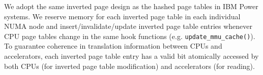 \vspace{2mm}
 We adopt the same inverted
page design as the hashed page tables in IBM Power systems. We reserve
memory for each inverted page table in each individual NUMA node and
insert/invalidate/update inverted page table entries whenever CPU page
tables change in the same hook functions
(e.g. \verb|update_mmu_cache()|). To guarantee coherence in
translation information between CPUs and accelerators, each inverted
page table entry has a valid bit atomically accessed by both CPUs (for
inverted page table modification) and accelerators (for
reading). 

  
\begin{comment}
Although end-to-end performance evaluation requires a full implementation of DTRIM in a modern OS (e.g., Linux, FreeBSD), like prior work which require OS changes \cite{talluri:surpassing, talluri:tradeoffs, talluri:pagetable}, we note that such implementation is a multi-man-year project. Consequently, like those studies, we instead inspect an open-source OS (i.e., Linux) and qualitatively discuss our proposed modifications.  

Fortunately, our two main modifications (i.e., memory-set matching and managing multiple page tables) are currently implemented in modern OS's. For instance, FreeBSD implements page coloring to avoid consecutive virtual pages mapping to the same cache set. FreeBSB does this with a free list of pages per cache set~\cite{mckusick:design}, guaranteeing that two consecutive virtual pages map to different cache sets. We can similarly extend the page placement policy to make both the VPN and PFN map to the same memory set. Further, the Linux Heterogeneous Memory Management (HMM) patch sets up multiple page tables and maintains the consistency~\cite{glisse:hmm}. We can leverage the lessons learned from these patches.

Table~\ref{tab:table_modifications} and Table~\ref{tab:table_overheads} shed more light on the OS changes and the potential overheads respectively. Although set associative VM is beneficial for a wide range of workloads, there might be cases for which full associative VM is required. Hence, we envision DTRIM to be an optional optimization (i.e., a process, set of processes, or the whole system can fall back to the conventional translation). This is conceptually similar to the way OSes support superpages, for which large portions of the OS required modifications along with their associated overheads with respect to supporting a single page size~\cite{talluri:surpassing, navarro:practical, kwon:coordinated}. Analogously, when super pages are not beneficial or impossible to generate, processes fall back to base pages. 
 

\end{comment}
